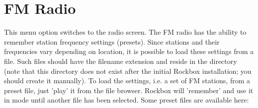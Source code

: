 \section{\label{ref:FMradio}FM Radio}  

  This menu option switches to the radio screen.
  The FM radio has the ability  to
  remember station frequency settings (presets). Since stations and their
  frequencies vary depending on location, it is possible to load these
  settings from a file. Such files should have the filename extension
   and reside in the directory 
  (note that this directory does not exist after the initial Rockbox
  installation; you should create it manually). To load the settings,
  i.e. a set of FM stations, from a preset file, just 'play' it from the
  file browser. Rockbox will 'remember' and use it in  mode
  until another file has been selected. Some preset files are available here:


